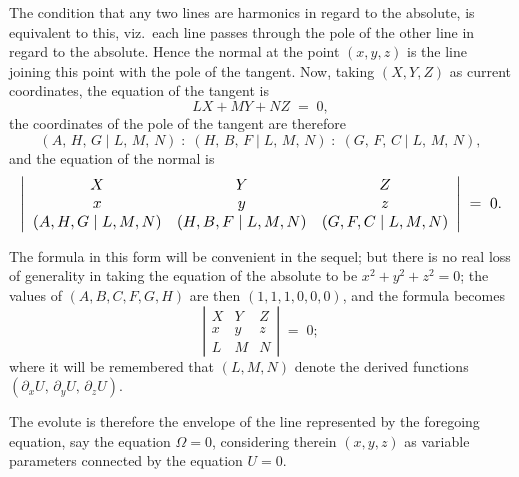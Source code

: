 \documentclass[11pt]{article}
\begin{document}
The condition that any two lines are harmonics in regard to the absolute, is equivalent to this, viz.\ each line passes through the pole of the other line in regard to the absolute. Hence the normal at the point $(x, y, z)$ is the line joining this point with the pole of the tangent. Now, taking $(X, Y, Z)$ as current coordinates, the equation of the tangent is
\[
LX + MY + NZ \;=\; 0,
\]
the coordinates of the pole of the tangent are therefore
\[
(A,\,H,\,G \mid L,\,M,\,N) \;:\; (H,\,B,\,F \mid L,\,M,\,N) \;:\; (G,\,F,\,C \mid L,\,M,\,N),
\]
and the equation of the normal is
\[
\resizebox{\textwidth}{!}{$\displaystyle
\left|\begin{array}{ccc}
X & Y & Z\\
x & y & z\\
(A, H, G \mid L, M, N) & (H, B, F \mid L, M, N) & (G, F, C \mid L, M, N)
\end{array}\right| \;=\; 0.
$}
\]

The formula in this form will be convenient in the sequel; but there is no real loss of generality in taking the equation of the absolute to be $x^{2} + y^{2} + z^{2} = 0$; the values of $(A, B, C, F, G, H)$ are then $(1, 1, 1, 0, 0, 0)$, and the formula becomes
\[
\left|\begin{array}{ccc}
X & Y & Z\\
x & y & z\\
L & M & N
\end{array}\right| \;=\; 0;
\]
where it will be remembered that $(L, M, N)$ denote the derived functions $(\partial_{x} U,\,\partial_{y} U,\,\partial_{z} U)$.

The evolute is therefore the envelope of the line represented by the foregoing equation, say the equation $\Omega = 0$, considering therein $(x, y, z)$ as variable parameters connected by the equation $U = 0$.
\end{document}
